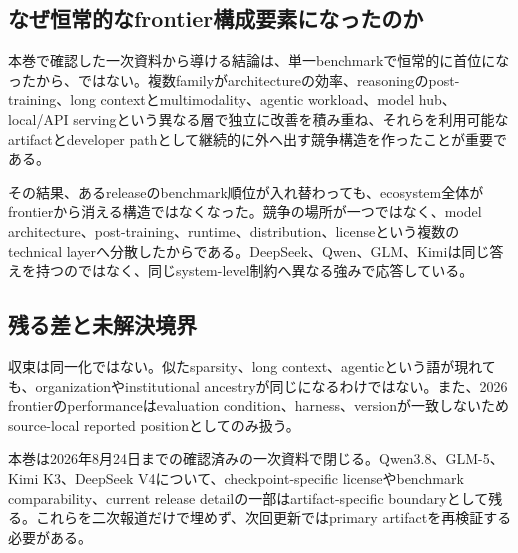 \documentclass[lualatex,a4paper,10pt]{jlreq}
\begin{document}
\subsection{なぜ恒常的なfrontier構成要素になったのか}
本巻で確認した一次資料から導ける結論は、単一benchmarkで恒常的に首位になったから、ではない。複数familyがarchitectureの効率、reasoningのpost-training、long contextとmultimodality、agentic workload、model hub、local/API servingという異なる層で独立に改善を積み重ね、それらを利用可能なartifactとdeveloper pathとして継続的に外へ出す競争構造を作ったことが重要である。

その結果、あるreleaseのbenchmark順位が入れ替わっても、ecosystem全体がfrontierから消える構造ではなくなった。競争の場所が一つではなく、model architecture、post-training、runtime、distribution、licenseという複数のtechnical layerへ分散したからである。DeepSeek、Qwen、GLM、Kimiは同じ答えを持つのではなく、同じsystem-level制約へ異なる強みで応答している。

\subsection{残る差と未解決境界}
収束は同一化ではない。似たsparsity、long context、agenticという語が現れても、organizationやinstitutional ancestryが同じになるわけではない。また、2026 frontierのperformanceはevaluation condition、harness、versionが一致しないためsource-local reported positionとしてのみ扱う。

本巻は2026年8月24日までの確認済みの一次資料で閉じる。Qwen3.8、GLM-5、Kimi K3、DeepSeek V4について、checkpoint-specific licenseやbenchmark comparability、current release detailの一部はartifact-specific boundaryとして残る。これらを二次報道だけで埋めず、次回更新ではprimary artifactを再検証する必要がある。\autocite{qwen38,glm5,kimik3,deepseekv4}
\end{document}
